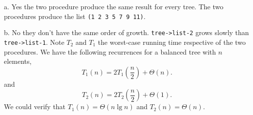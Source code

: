 \documentclass[a4paper,12pt]{article}
\newcommand{\subpar}[1] {\medskip \noindent #1.} \lstset{language=Lisp}
\begin{document}
\subpar{a}  Yes the two procedure produce the same result for every
tree.  The two procedures produce the list
\lstinline!(1 2 3 5 7 9 11)!.

\subpar{b} No they don't have the same order of growth.
\lstinline!tree->list-2!  grows slowly than \lstinline!tree->list-1!.
Note $T_2$ and $T_1$ the worst-case running time respective of the two
procedures. We have the following recurrences for a balanced tree with
$n$ elements,
\[ T_1(n) = 2 T_1\left(\frac{n}{2}\right) + \Theta(n).\]
and
\[ T_2(n) = 2T_2\left(\frac{n}{2}\right) + \Theta(1).\]
We could verify that $T_1(n) = \Theta(n\lg n)$ and $T_2(n) = \Theta(n)$.
\end{document}
